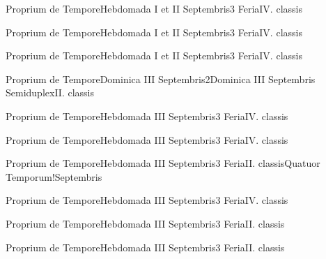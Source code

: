 \documentclass[liber-responsorialis_temporale.tex]{subfiles}
\begin{document}
	{Proprium de Tempore}{Hebdomada I et II Septembris}{3}{}
	{Feria}{IV. classis}{}
	{}
	{}

	{Proprium de Tempore}{Hebdomada I et II Septembris}{3}{}
	{Feria}{IV. classis}{}
	{}
	{}

	{Proprium de Tempore}{Hebdomada I et II Septembris}{3}{}
	{Feria}{IV. classis}{}
	{}
	{}

\vspace{\baselineskip}

	{Proprium de Tempore}{Dominica III Septembris}{2}{Dominica III Septembris}
	{Semiduplex}{II. classis}{}
	{}
	{}
\pagebreak
{}
\sixlinesvspace
\pagebreak
{}
\pagebreak
{}
\vspace{2\baselineskip}

	{Proprium de Tempore}{Hebdomada III Septembris}{3}{}
	{Feria}{IV. classis}{}
	{}
	{}


	{Proprium de Tempore}{Hebdomada III Septembris}{3}{}
	{Feria}{IV. classis}{}
	{}
	{}

	{Proprium de Tempore}{Hebdomada III Septembris}{3}{}
	{Feria}{II. classis}{Quatuor Temporum!Septembris}
	{}
	{}

	{Proprium de Tempore}{Hebdomada III Septembris}{3}{}
	{Feria}{IV. classis}{}
	{}
	{}

	{Proprium de Tempore}{Hebdomada III Septembris}{3}{}
	{Feria}{II. classis}{}
	{}
	{}

	{Proprium de Tempore}{Hebdomada III Septembris}{3}{}
	{Feria}{II. classis}{}
	{}
	{}
\end{document}

